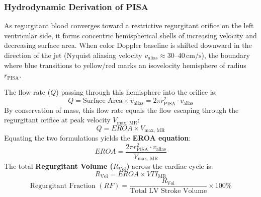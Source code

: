 \documentclass[11pt,a4paper]{article}
\begin{document}
\subsubsection{Hydrodynamic Derivation of PISA}
As regurgitant blood converges toward a restrictive regurgitant orifice on the left ventricular side, it forms concentric hemispherical shells of increasing velocity and decreasing surface area. When color Doppler baseline is shifted downward in the direction of the jet (Nyquist aliasing velocity $v_{\text{alias}} \approx 30\text{--}40\,\text{cm/s}$), the boundary where blue transitions to yellow/red marks an isovelocity hemisphere of radius $r_{\text{PISA}}$.

The flow rate ($Q$) passing through this hemisphere into the orifice is:
\begin{equation}
    Q = \text{Surface Area} \times v_{\text{alias}} = 2\pi r_{\text{PISA}}^2 \cdot v_{\text{alias}}
\end{equation}
By conservation of mass, this flow rate equals the flow escaping through the regurgitant orifice at peak velocity $V_{\text{max, MR}}$:
\begin{equation}
    Q = EROA \times V_{\text{max, MR}}
\end{equation}
Equating the two formulations yields the \textbf{EROA equation}:
\begin{equation}
    EROA = \frac{2\pi r_{\text{PISA}}^2 \cdot v_{\text{alias}}}{V_{\text{max, MR}}}
\end{equation}
The total \textbf{Regurgitant Volume ($R_{\text{Vol}}$)} across the cardiac cycle is:
\begin{equation}
    R_{\text{Vol}} = EROA \times VTI_{\text{MR}}
\end{equation}
\begin{equation}
    \text{Regurgitant Fraction } (RF) = \frac{R_{\text{Vol}}}{\text{Total LV Stroke Volume}} \times 100\%
\end{equation}
\end{document}
